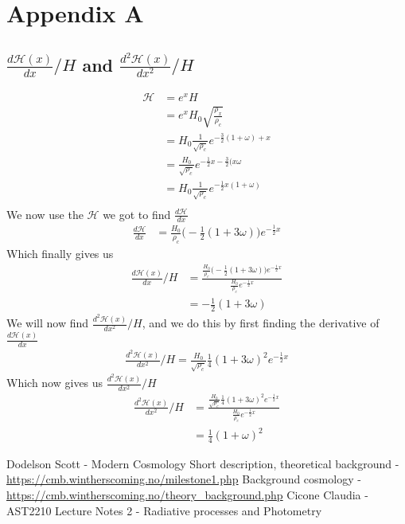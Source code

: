 \documentclass{article}
\begin{document}
\section{Appendix A}
\label{A.1}
\subsection{$\frac{d\mathcal{H}(x)}{dx}/H$ and $\frac{d^2\mathcal{H}(x)}{dx^2}/H$}
\begin{align*}
    {\mathcal{H}}&=e^xH\\
    &=e^xH_0\sqrt{\frac{\rho_x}{\rho_c}}\\
    &=H_0\frac{1}{\sqrt{\rho_c}}e^{-\frac{3}{2}(1+\omega)+x}\\
    &=\frac{H_0}{\sqrt{\rho_c}}e^{-\frac{1}{2}x-\frac{3}{2}(x\omega}\\
    &=H_0\frac{1}{\sqrt{\rho_c}}e^{-\frac{1}{2}x(1+\omega)}\\
\end{align*}
We now use the $\mathcal{H}$ we got to find $\frac{d\mathcal{H}}{dx}$ 
\begin{align*}
    \frac{d\mathcal{H}}{dx}&=\frac{H_0}{\rho_c}\bigg(-\frac{1}{2}(1+3\omega)\bigg)e^{-\frac{1}{2}x}
\end{align*}
Which finally gives us 
\begin{align}
    {\frac{d\mathcal{H}(x)}{dx}/H}&=\frac{\frac{H_0}{\rho_c}\bigg(-\frac{1}{2}(1+3\omega)\bigg)e^{-\frac{1}{2}x}}{\frac{H_0}{\rho_c}e^{-\frac{1}{2}x}}\\
    &=-\frac{1}{2}(1+3\omega)
\end{align}
We will now find $\frac{d^2\mathcal{H}(x)}{dx^2}/H$, and we do this by first finding the derivative of $\frac{d\mathcal{H}(x)}{dx}$
\begin{align}
    \frac{d^2\mathcal{H}(x)}{dx^2}/H=\frac{H_0}{\sqrt{\rho_c}}\frac{1}{4}(1+3\omega)^2e^{-\frac{1}{2}x} 
\end{align}
Which now gives us $\frac{d^2\mathcal{H}(x)}{dx^2}/H$
\begin{align}
    \frac{d^2\mathcal{H}(x)}{dx^2}/H&=\frac{\frac{H_0}{\sqrt{\rho_c}}\frac{1}{4}(1+3\omega)^2e^{-\frac{1}{2}x} }{\frac{H_0}{\rho_c}e^{-\frac{1}{2}x}}\\
    &=\frac{1}{4}(1+\omega)^2
\end{align}
\begin{thebibliography}{9}
    Dodelson Scott - Modern Cosmology 
	Short description, theoretical background - \url{https://cmb.wintherscoming.no/milestone1.php} 
	Background cosmology - \url{https://cmb.wintherscoming.no/theory_background.php} 
    Cicone Claudia - AST2210 Lecture Notes 2 - Radiative processes and Photometry 
\end{thebibliography}
\end{document}
